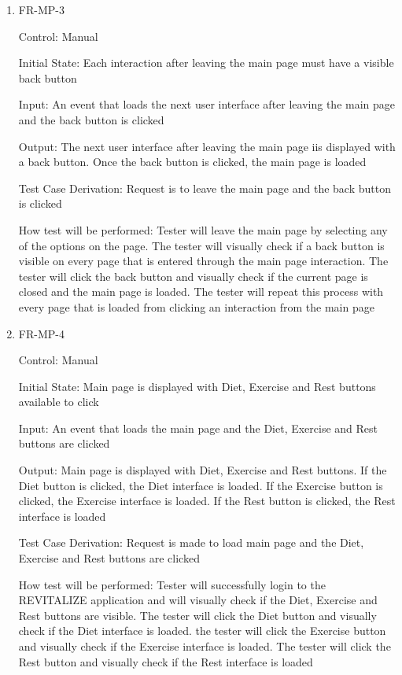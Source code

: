 \documentclass[12pt, titlepage]{article}
\begin{document}
\begin{enumerate}
\item{FR-MP-3\\}

Control: Manual
					
Initial State: Each interaction after leaving the main page must have a visible back button
					
Input: An event that loads the next user interface after leaving the main page and the back button is clicked
					
Output: The next user interface after leaving the main page iis displayed with a back button. Once the back button is clicked, the main page is loaded

Test Case Derivation: Request is to leave the main page and the back button is clicked

How test will be performed: Tester will leave the main page by selecting any of the options on the page. The tester will visually check if a back button is visible on every page that is entered through the main page interaction. The tester will click the back button and visually check if the current page is closed and the main page is loaded. The tester will repeat this process with every page that is  loaded from clicking an interaction from the main page
					
\item{FR-MP-4\\}

Control: Manual
					
Initial State: Main page is displayed with Diet, Exercise and Rest buttons available to click
					
Input: An event that loads the main page and the Diet, Exercise and Rest buttons are clicked

Output: Main page is displayed with Diet, Exercise and Rest buttons. If the Diet button is clicked, the Diet interface is loaded. If the Exercise button is clicked, the Exercise interface is loaded. If the Rest button is clicked, the Rest interface is loaded

Test Case Derivation: Request is made to load main page and the Diet, Exercise and Rest buttons are clicked

How test will be performed: Tester will successfully login to the REVITALIZE application and will visually check if the Diet, Exercise and Rest buttons are visible. The tester will click the Diet button and visually check if the Diet interface is loaded. the tester will click the Exercise button and visually check if the Exercise interface is loaded. The tester will click the Rest button and visually check if the Rest interface is loaded

\end{enumerate}
\end{document}
